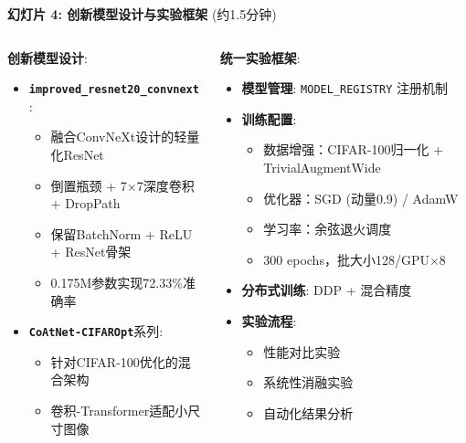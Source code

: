 \documentclass[10pt]{beamer}
\begin{document}
\begin{frame}{\textbf{幻灯片 4: 创新模型设计与实验框架} (约1.5分钟)}
{\small
\begin{columns}[T]
    \begin{column}{0.5\textwidth}
        \textbf{创新模型设计}:
        \begin{itemize}
            \item \textbf{\texttt{improved\_resnet20\_convnext}}:
            \begin{itemize}
                \item 融合ConvNeXt设计的轻量化ResNet
                \item 倒置瓶颈 + 7×7深度卷积 + DropPath
                \item 保留BatchNorm + ReLU + ResNet骨架
                \item 0.175M参数实现72.33\%准确率
            \end{itemize}
            \item \textbf{\texttt{CoAtNet-CIFAROpt}}系列:
            \begin{itemize}
                \item 针对CIFAR-100优化的混合架构
                \item 卷积-Transformer适配小尺寸图像
            \end{itemize}
        \end{itemize}
    \end{column}
    \begin{column}{0.5\textwidth}
        \textbf{统一实验框架}:
        \begin{itemize}
            \item \textbf{模型管理}: \texttt{MODEL\_REGISTRY} 注册机制
            \item \textbf{训练配置}:
            \begin{itemize}
                \item 数据增强：CIFAR-100归一化 + TrivialAugmentWide
                \item 优化器：SGD (动量0.9) / AdamW
                \item 学习率：余弦退火调度
                \item 300 epochs，批大小128/GPU×8
            \end{itemize}
            \item \textbf{分布式训练}: DDP + 混合精度 \cite{Paszke2019PyTorch}
            \item \textbf{实验流程}:
            \begin{itemize}
                \item 性能对比实验
                \item 系统性消融实验
                \item 自动化结果分析
            \end{itemize}
        \end{itemize}
    \end{column}
\end{columns}
}

\end{frame}
\end{document}
